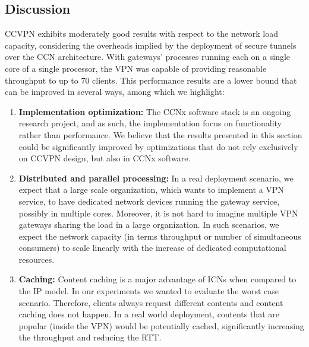 \subsection{Discussion}

CCVPN  exhibits moderately good results with respect to the network load capacity, considering the overheads implied by the deployment of secure tunnels over the CCN architecture.
With gateways' processes running each on a single core of a single processor, the VPN was capable of providing reasonable throughput to up to 70 clients.
This performance results are a lower bound that can be improved in several ways, among which we highlight:

\begin{enumerate}
 \item \textbf{Implementation optimization:} The CCNx software stack is an ongoing research project, and as such, the implementation focus on functionality rather than performance.
 We believe that the results presented in this section could be significantly improved by optimizations that do not rely exclusively on CCVPN design, but also in CCNx software.
 \item \textbf{Distributed and parallel processing:} In a real deployment scenario, we expect that a large scale organization, which wants to implement a VPN service, to have dedicated network devices running
 the gateway service, possibly in multiple cores. Moreover, it is not hard to imagine multiple VPN gateways sharing the load in a large organization.
 In such scenarios, we expect the network capacity (in terms throughput or number of simultaneous consumers) to scale linearly with the increase of dedicated computational resources.
 \item \textbf{Caching:} Content caching is a major advantage of ICNs when compared to the IP model. In our experiments we wanted to evaluate the worst case scenario. Therefore, clients always request different contents
 and content caching does not happen. In a real world deployment, contents that are popular (inside the VPN) would be potentially cached, significantly increasing the throughput and reducing the RTT.
 
\end{enumerate}



